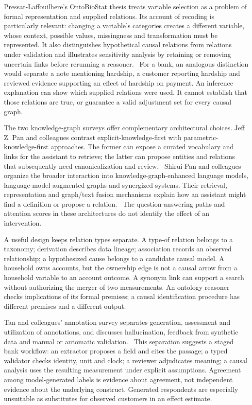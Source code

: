 Pressat-Laffouilhere's OntoBioStat thesis treats variable selection as a problem
of formal representation and supplied relations. Its account of recoding is
particularly relevant: changing a variable's categories creates a different
variable, whose context, possible values, missingness and transformation must
be represented. It also distinguishes hypothetical causal relations from
relations under validation and illustrates sensitivity analysis by retaining
or removing uncertain links before rerunning a reasoner.~\citep{exec17_ontology_thesis}
For a bank, an analogous distinction would separate a note mentioning
hardship, a customer reporting hardship and reviewed evidence supporting an
effect of hardship on payment. An inference explanation can show which
supplied relations were used. It cannot establish that those relations are
true, or guarantee a valid adjustment set for every causal graph.

The two knowledge-graph surveys offer complementary architectural choices.
Jeff Z. Pan and colleagues contrast explicit-knowledge-first with
parametric-knowledge-first approaches. The former can expose a curated
vocabulary and links for the assistant to retrieve; the latter can propose
entities and relations that subsequently need canonicalization and
review.~\citep{exec17_ontology_kg_challenges} Shirui Pan and colleagues organize
the broader interaction into knowledge-graph-enhanced language models,
language-model-augmented graphs and synergized systems. Their retrieval,
representation and graph/text fusion mechanisms explain how an assistant might
find a definition or propose a relation.~\citep{exec17_ontology_kg_roadmap}
The question-answering paths and attention scores in these architectures do
not identify the effect of an intervention.

A useful design keeps relation types separate. A type-of relation
belongs to a taxonomy; derivation describes data lineage; association
records an observed relationship; a hypothesized cause belongs to a
candidate causal model. A household owns accounts, but the ownership edge is
not a causal arrow from a household variable to an account outcome. A synonym
link can support a search without authorizing the merger of two measurements.
An ontology reasoner checks implications of its formal premises; a causal
identification procedure has different premises and a different output.

Tan and colleagues' annotation survey separates generation, assessment and
utilization of annotations, and discusses hallucination, feedback from
synthetic data and manual or automatic validation.~\citep{exec17_ontology_annotation}
This separation suggests a staged bank workflow: an extractor proposes a
field and cites the passage; a typed validator checks identity, unit and
clock; a reviewer adjudicates meaning; a causal analysis uses the resulting
measurement under explicit assumptions. Agreement among model-generated
labels is evidence about agreement, not independent evidence about the
underlying construct. Generated respondents are especially unsuitable as
substitutes for observed customers in an effect estimate.

